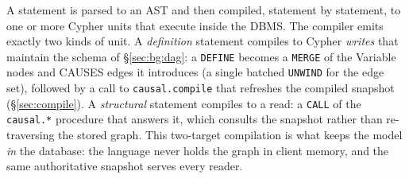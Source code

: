 A statement is parsed to an AST and then compiled, statement by statement, to one
or more Cypher units that execute inside the DBMS. The compiler emits exactly two
kinds of unit. A \emph{definition} statement compiles to Cypher \emph{writes}
that maintain the schema of \S\ref{sec:bg:dag}: a \lstinline[style=causaldsl]|DEFINE|
becomes a \texttt{MERGE} of the \textsf{Variable} nodes and \textsf{CAUSES} edges
it introduces (a single batched \texttt{UNWIND} for the edge set), followed by a
call to \texttt{causal.compile} that refreshes the compiled snapshot
(\S\ref{sec:compile}). A \emph{structural} statement compiles to a read: a
\texttt{CALL} of the \texttt{causal.*} procedure that answers it, which consults
the snapshot rather than re-traversing the stored graph. This two-target
compilation is what keeps the model \emph{in} the database: the language never
holds the graph in client memory, and the same authoritative snapshot serves
every reader.

